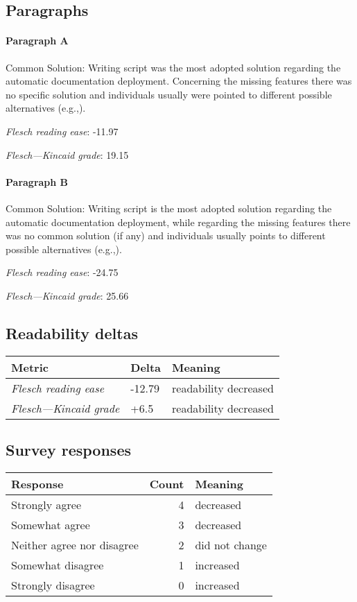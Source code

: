 \subsection{Paragraphs}
\paragraph{Paragraph A}
Common Solution: Writing script was the most adopted solution regarding the automatic documentation deployment. Concerning the missing features there was no specific solution and individuals usually were pointed to different possible alternatives (e.g.,).\par\medskip
\emph{Flesch reading ease}: -11.97\par
\emph{Flesch---Kincaid grade}: 19.15

\paragraph{Paragraph B}
Common Solution: Writing script is the most adopted solution regarding the automatic documentation deployment, while regarding the missing features there was no common solution (if any) and individuals usually points to different possible alternatives (e.g.,).\par\medskip
\emph{Flesch reading ease}: -24.75\par
\emph{Flesch---Kincaid grade}: 25.66

\subsection{Readability deltas}

\begin{tabular}{lll}
\toprule
               \textbf{Metric} & \textbf{Delta} &       \textbf{Meaning} \\
\midrule
    \emph{Flesch reading ease} &         -12.79 &  readability decreased \\
 \emph{Flesch---Kincaid grade} &           +6.5 &  readability decreased \\
\bottomrule
\end{tabular}

\subsection{Survey responses}
\begin{tabular}{lrl}
\toprule
          \textbf{Response} &  \textbf{Count} & \textbf{Meaning} \\
\midrule
             Strongly agree &               4 &        decreased \\
             Somewhat agree &               3 &        decreased \\
 Neither agree nor disagree &               2 &   did not change \\
          Somewhat disagree &               1 &        increased \\
          Strongly disagree &               0 &        increased \\
\bottomrule
\end{tabular}

